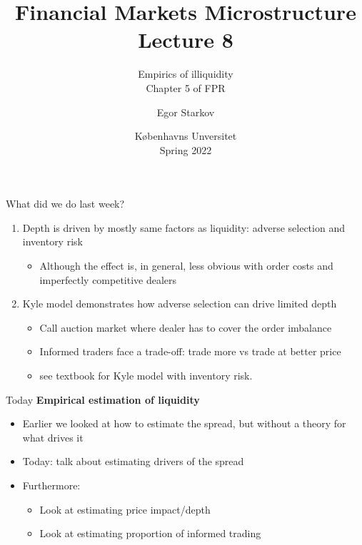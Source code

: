 \documentclass[english,10pt
,aspectratio=169
]{beamer}
\title{Financial Markets Microstructure \\ Lecture 8}
\subtitle{Empirics of illiquidity\\
	Chapter 5 of FPR}
\author{Egor Starkov}
\date{K{\o}benhavns Unversitet \\
	Spring 2022}
\begin{document}
	

\frame[plain]{\titlepage}


\begin{frame}{What did we do last week?}
	\begin{enumerate}
		\item Depth is driven by mostly same factors as liquidity: adverse selection and inventory risk
		\begin{itemize}
			\item Although the effect is, in general, less obvious with order costs and imperfectly competitive dealers
		\end{itemize}
		\item Kyle model demonstrates how adverse selection can drive limited depth
		\begin{itemize}
			\item Call auction market where dealer has to cover the order imbalance
			\item Informed traders face a trade-off: trade more vs trade at better price
			\item see textbook for Kyle model with inventory risk.
		\end{itemize}
	\end{enumerate}
\end{frame}


\begin{frame}{Today}
	\textbf{Empirical estimation of liquidity}
	\begin{itemize}
		\item Earlier we looked at how to estimate the spread, but without a theory for what drives it
		\item Today: talk about estimating drivers of the spread
		\item Furthermore:
		\begin{itemize}
			\item Look at estimating price impact/depth
			\item Look at estimating proportion of informed trading
		\end{itemize}
	\end{itemize}
\end{frame}
\end{document}
